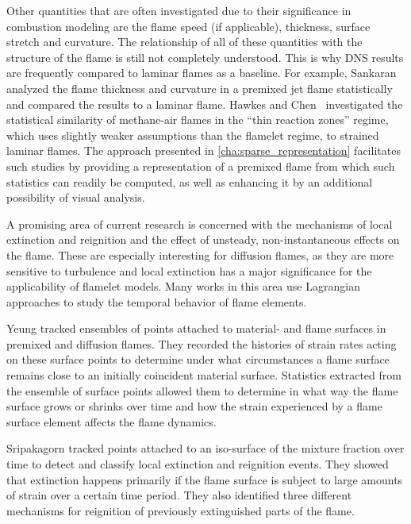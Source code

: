 %
Other quantities that are often investigated due to their significance in
combustion modeling are the flame speed (if applicable), thickness, surface
stretch and curvature.
%
The relationship of all of these quantities with the structure of the flame is
still not completely understood.
%
This is why \ac{DNS} results are frequently compared to laminar flames as a
baseline.
%
For example, Sankaran \etal \cite{Sankaran2007} analyzed the flame thickness and
curvature in a premixed jet flame statistically and compared the results to a
laminar flame.
%
Hawkes and Chen~\cite{Hawkes2006} investigated the statistical similarity of
methane-air flames in the ``thin reaction zones'' regime, which uses slightly
weaker assumptions than the flamelet regime, to strained laminar flames.
%
The approach presented in \cref{cha:sparse_representation} facilitates such
studies by providing a representation of a premixed flame from which such
statistics can readily be computed, as well as enhancing it by an additional
possibility of visual analysis.
%

%
A promising area of current research is concerned with the mechanisms of local
extinction and reignition and the effect of unsteady, non-instantaneous effects
on the flame.
%
These are especially interesting for diffusion flames, as they are more
sensitive to turbulence and local extinction has a major significance for the
applicability of flamelet models.
%
Many works in this area use Lagrangian approaches to study the temporal behavior
of flame elements.
%

%
Yeung \etal \cite{Yeung1990} tracked ensembles of points attached to material-
and flame surfaces in premixed and diffusion flames.
%
They recorded the histories of strain rates acting on these surface points to
determine under what circumstances a flame surface remains close to an initially
coincident material surface.
%
Statistics extracted from the ensemble of surface points allowed them to
determine in what way the flame surface grows or shrinks over time and how the
strain experienced by a flame surface element affects the flame dynamics.
%

%
Sripakagorn \etal \cite{Sripakagorn2004} tracked points attached to an
iso-surface of the mixture fraction over time to detect and classify local
extinction and reignition events.
%
They showed that extinction happens primarily if the flame surface is subject to
large amounts of strain over a certain time period.
%
They also identified three different mechanisms for reignition of previously
extinguished parts of the flame.
%

